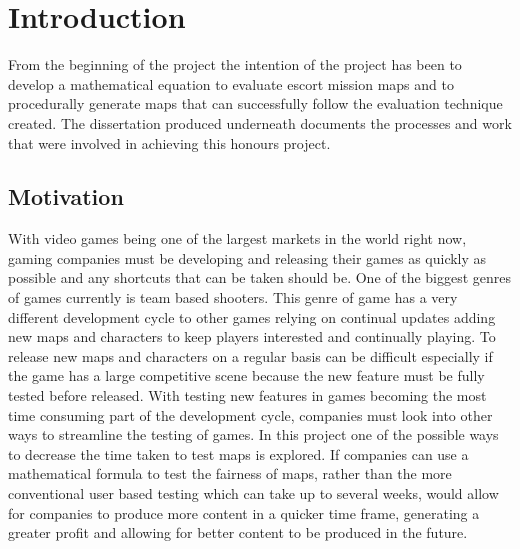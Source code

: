 \documentclass{article}
\begin{document}
\title{{}}
\author{Adam Blance}

\maketitle

\begin{abstract}
The abstract text goes here.
\end{abstract}

\section{Introduction}
From the beginning of the project the intention of the project has been to develop a mathematical equation to evaluate escort mission maps and to procedurally generate maps that can successfully follow the evaluation technique created. The dissertation produced underneath documents the processes and work that were involved in achieving this honours project.
\subsection{Motivation}
With video games being one of the largest markets in the world right now, gaming companies must be developing and releasing their games as quickly as possible and \vspace{5mm}any shortcuts that can be taken should be. 
\newline  
One of the biggest genres of games currently is team based shooters. This genre of game has a very different development cycle to other games relying on continual updates adding new maps and characters to keep players interested and continually playing. To release new maps and characters on a regular basis can be difficult especially if the game has a large competitive scene because the new feature \vspace{5mm} must be fully tested before released.
\newline  
With testing new features in games becoming the most time consuming part of the development cycle, companies must look into other ways to streamline the testing of games. In this project one of the possible ways to decrease the time taken to test maps is explored. If companies can use a mathematical formula to test the fairness of maps, rather than the more conventional user based testing which can take up to several weeks, would allow for companies to produce more content in a quicker time frame, generating a greater profit and allowing for better content to be produced in the future. 
\end{document}
